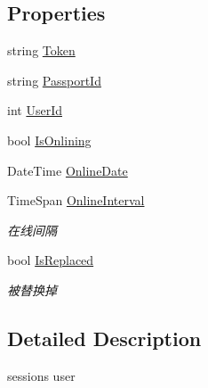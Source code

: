 \subsection*{Properties}
\begin{DoxyCompactItemize}
\item 
string \mbox{\hyperlink{class_t_net_1_1_contract_1_1_session_user_a159b7af7a3feb3287cbd1341a6fff47b}{Token}}
\item 
string \mbox{\hyperlink{class_t_net_1_1_contract_1_1_session_user_adba1563206f6f2728e5718586a51dde2}{Passport\+Id}}
\item 
int \mbox{\hyperlink{class_t_net_1_1_contract_1_1_session_user_a9e7899566c3356929de2ce5ec07d2210}{User\+Id}}
\item 
bool \mbox{\hyperlink{class_t_net_1_1_contract_1_1_session_user_ab5de4a55eeb71133e30706cece740622}{Is\+Onlining}}
\item 
Date\+Time \mbox{\hyperlink{class_t_net_1_1_contract_1_1_session_user_a87b046c8977efebb572c48618e0f49ce}{Online\+Date}}
\item 
Time\+Span \mbox{\hyperlink{class_t_net_1_1_contract_1_1_session_user_a360325446a1d13926a19f470af79bb49}{Online\+Interval}}
\begin{DoxyCompactList}\small\item\em 在线间隔 \end{DoxyCompactList}\item 
bool \mbox{\hyperlink{class_t_net_1_1_contract_1_1_session_user_a37828ed757b1e96990a6c26f97d8b285}{Is\+Replaced}}
\begin{DoxyCompactList}\small\item\em 被替换掉 \end{DoxyCompactList}\end{DoxyCompactItemize}


\subsection{Detailed Description}
session\textquotesingle{}s user 



